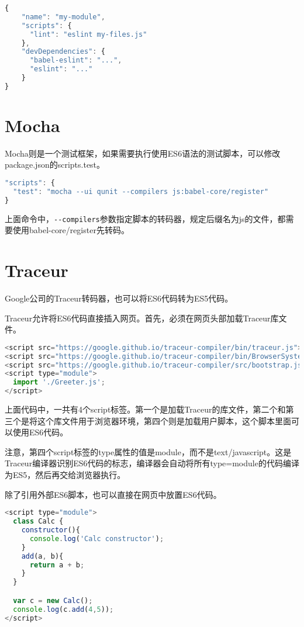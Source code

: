 \begin{lstlisting}[language=JavaScript]
{
    "name": "my-module",
    "scripts": {
      "lint": "eslint my-files.js"
    },
    "devDependencies": {
      "babel-eslint": "...",
      "eslint": "..."
    }
}
\end{lstlisting}

\section{Mocha}

Mocha则是一个测试框架，如果需要执行使用ES6语法的测试脚本，可以修改package.json的scripts.test。



\begin{lstlisting}[language=JavaScript]
"scripts": {
  "test": "mocha --ui qunit --compilers js:babel-core/register"
}
\end{lstlisting}


上面命令中，\texttt{-\/-compilers}参数指定脚本的转码器，规定后缀名为js的文件，都需要使用babel-core/register先转码。


\section{Traceur}

Google公司的Traceur转码器，也可以将ES6代码转为ES5代码。

Traceur允许将ES6代码直接插入网页。首先，必须在网页头部加载Traceur库文件。

\begin{lstlisting}[language=JavaScript]
<script src="https://google.github.io/traceur-compiler/bin/traceur.js"></script>
<script src="https://google.github.io/traceur-compiler/bin/BrowserSystem.js"></script>
<script src="https://google.github.io/traceur-compiler/src/bootstrap.js"></script>
<script type="module">
  import './Greeter.js';
</script>
\end{lstlisting}

上面代码中，一共有4个script标签。第一个是加载Traceur的库文件，第二个和第三个是将这个库文件用于浏览器环境，第四个则是加载用户脚本，这个脚本里面可以使用ES6代码。

注意，第四个script标签的type属性的值是module，而不是text/javascript。这是Traceur编译器识别ES6代码的标志，编译器会自动将所有type=module的代码编译为ES5，然后再交给浏览器执行。

除了引用外部ES6脚本，也可以直接在网页中放置ES6代码。

\begin{lstlisting}[language=JavaScript]
<script type="module">
  class Calc {
    constructor(){
      console.log('Calc constructor');
    }
    add(a, b){
      return a + b;
    }
  }

  var c = new Calc();
  console.log(c.add(4,5));
</script>
\end{lstlisting}

